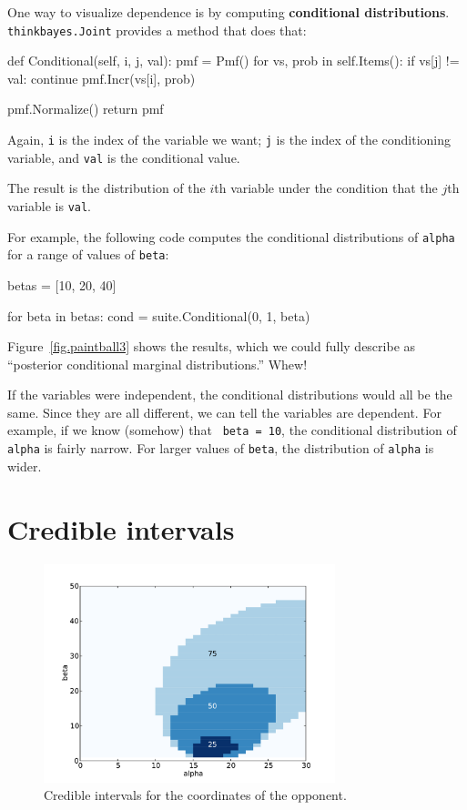 \documentclass[12pt]{book}
\theoremstyle{exercise}
\begin{document}
One way to visualize dependence is by computing {\bf conditional
distributions}.  {\tt thinkbayes.Joint} provides a method that
does that:

\begin{code}
    def Conditional(self, i, j, val):
        pmf = Pmf()
        for vs, prob in self.Items():
            if vs[j] != val: continue
            pmf.Incr(vs[i], prob)

        pmf.Normalize()
        return pmf
\end{code}

Again, {\tt i} is the index of the variable we want; {\tt j}
is the index of the conditioning variable, and {\tt val} is the
conditional value.

The result is the distribution of the $i$th variable under the
condition that the $j$th variable is {\tt val}.

For example, the following code computes the conditional distributions
of {\tt alpha} for a range of values of {\tt beta}:

\begin{code}
    betas = [10, 20, 40]

    for beta in betas:
        cond = suite.Conditional(0, 1, beta)
\end{code}

Figure~\ref{fig.paintball3} shows the results, which we could
fully describe as ``posterior conditional marginal distributions.''
Whew!

If the variables were independent, the conditional distributions would
all be the same.  Since they are all different, we can tell the
variables are dependent.  For example, if we know (somehow) that {\tt
  beta = 10}, the conditional distribution of {\tt alpha} is fairly
narrow.  For larger values of {\tt beta}, the distribution of
{\tt alpha} is wider.


\section{Credible intervals}

\begin{figure}
\centerline{\includegraphics[height=2.5in]{figs/paintball5.pdf}}
\caption{Credible intervals for the coordinates of the opponent.}
\label{fig.paintball5}
\end{figure}
\end{document}
